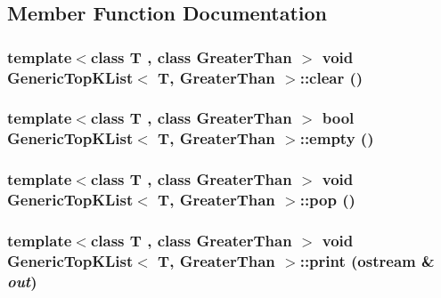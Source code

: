 \subsection{Member Function Documentation}
\hypertarget{class_generic_top_k_list_a98580415dbb972ff050d31f16cfa6298}{
\subsubsection[{clear}]{\setlength{\rightskip}{0pt plus 5cm}template$<$class T , class GreaterThan $>$ void {\bf GenericTopKList}$<$ T, GreaterThan $>$::clear ()}}
\label{class_generic_top_k_list_a98580415dbb972ff050d31f16cfa6298}
\hypertarget{class_generic_top_k_list_aaab77d173b58c924ea81bb5c8fead8d5}{
\subsubsection[{empty}]{\setlength{\rightskip}{0pt plus 5cm}template$<$class T , class GreaterThan $>$ bool {\bf GenericTopKList}$<$ T, GreaterThan $>$::empty ()}}
\label{class_generic_top_k_list_aaab77d173b58c924ea81bb5c8fead8d5}
\hypertarget{class_generic_top_k_list_a0d65002433e3b2707c6966c3c86b9bbb}{
\subsubsection[{pop}]{\setlength{\rightskip}{0pt plus 5cm}template$<$class T , class GreaterThan $>$ void {\bf GenericTopKList}$<$ T, GreaterThan $>$::pop ()}}
\label{class_generic_top_k_list_a0d65002433e3b2707c6966c3c86b9bbb}
\hypertarget{class_generic_top_k_list_a055c25c654e83e69b7db1f3247b169a3}{
\subsubsection[{print}]{\setlength{\rightskip}{0pt plus 5cm}template$<$class T , class GreaterThan $>$ void {\bf GenericTopKList}$<$ T, GreaterThan $>$::print (ostream \& {\em out})}}
